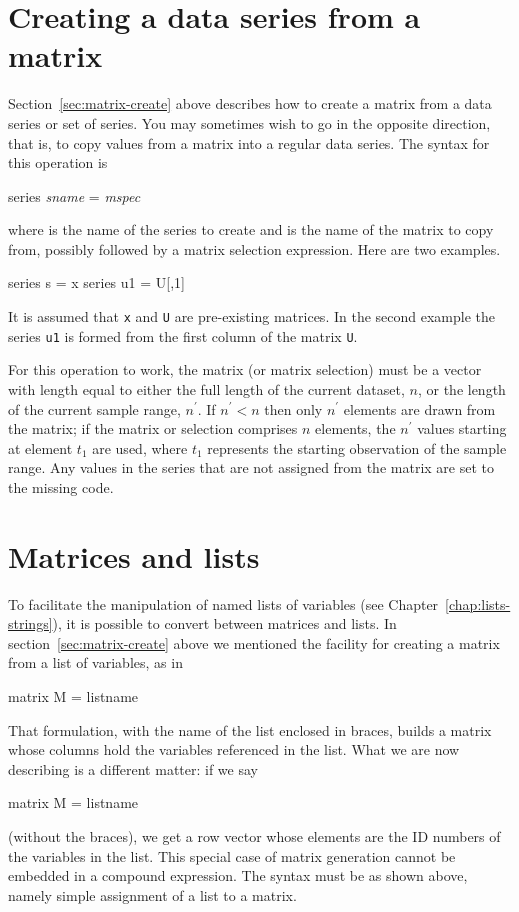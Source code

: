 \section{Creating a data series from a matrix}
\label{matrix-create-series}

Section~\ref{sec:matrix-create} above describes how to create a matrix
from a data series or set of series.  You may sometimes wish to go in
the opposite direction, that is, to copy values from a matrix 
into a regular data series.  The syntax for this operation is
%
\begin{textcode}
series \textsl{sname} = \textsl{mspec}
\end{textcode}
%
where  is the name of the series to create and
 is the name of the matrix to copy from, possibly followed
by a matrix selection expression.  Here are two examples.
%
\begin{code}
series s = x
series u1 = U[,1]
\end{code}
%
It is assumed that \texttt{x} and \texttt{U} are pre-existing
matrices.  In the second example the series \texttt{u1} is formed from
the first column of the matrix \texttt{U}.

For this operation to work, the matrix (or matrix selection) must be a
vector with length equal to either the full length of the current
dataset, $n$, or the length of the current sample range, $n^{\prime}$.
If $n^{\prime} < n$ then only $n^{\prime}$ elements are drawn from the
matrix; if the matrix or selection comprises $n$ elements, the
$n^{\prime}$ values starting at element $t_1$ are used, where $t_1$
represents the starting observation of the sample range.  Any values
in the series that are not assigned from the matrix are set to the
missing code.


\section{Matrices and lists}
\label{matrix-and-list}

To facilitate the manipulation of named lists of variables (see
Chapter~\ref{chap:lists-strings}), it is possible to convert between
matrices and lists.  In section~\ref{sec:matrix-create} above we mentioned
the facility for creating a matrix from a list of variables, as in
%
\begin{code}
matrix M = { listname }
\end{code}
%
That formulation, with the name of the list enclosed in braces, builds
a matrix whose columns hold the variables referenced in the list.
What we are now describing is a different matter: if we say
%
\begin{code}
matrix M = listname
\end{code}
%
(without the braces), we get a row vector whose elements are
the ID numbers of the variables in the list.  This special case
of matrix generation cannot be embedded in a compound
expression.  The syntax must be as shown above, namely simple
assignment of a list to a matrix.

